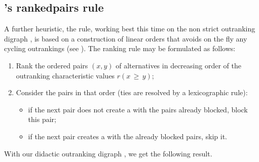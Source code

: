 \documentclass[a4paper,12pt,english]{sphinxhowto}
\begin{document}
\subsection{’s ranked\sphinxhyphen{}pairs rule}
\label{\detokenize{tutorial:tideman-s-ranked-pairs-rule}}
A further  heuristic, the  rule, working best this time on the non strict outranking digraph , is based on a  construction of linear orders that avoids on the fly any cycling outrankings (see ). The ranking rule may be formulated as follows:
\begin{enumerate}
%
\item {} 
Rank the ordered pairs \((x,y)\) of alternatives in decreasing order of the outranking characteristic values \(r(x\, \geq \,y)\);

\item {} 
Consider the pairs in that order (ties are resolved by a lexicographic rule):
\begin{itemize}
\item {} 
if the next pair does not create a  with the pairs already blocked, block this pair;

\item {} 
if the next pair creates a  with the already blocked pairs, skip it.

\end{itemize}

\end{enumerate}

With our didactic outranking digraph , we get the following result.
\def\sphinxLiteralBlockLabel{\label{\detokenize{tutorial:rankedpairsranking}}}
\begin{sphinxVerbatim}[commandchars=\\\{\},numbers=left,firstnumber=1,stepnumber=1]
   
  
\end{sphinxVerbatim}
\end{document}
